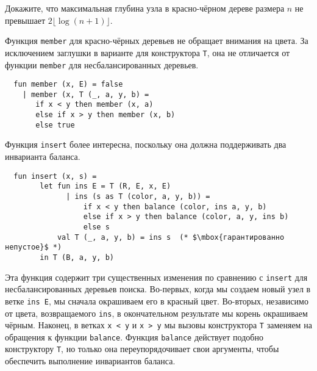 \begin{exercise}\label{ex:3.8}
  Докажите, что максимальная глубина узла в красно-чёрном дереве
  размера $n$ не превышает $2 \lfloor \log (n+1) \rfloor$.
\end{exercise}

Функция \lstinline!member! для красно-чёрных деревьев не обращает
внимания на цвета. За исключением заглушки в варианте для конструктора
\lstinline!T!, она не отличается от функции \lstinline!member! для
несбалансированных деревьев.
\begin{lstlisting}
  fun member (x, E) = false
    | member (x, T (_, a, y, b) =
       if x < y then member (x, a)
       else if x > y then member (x, b)
       else true
\end{lstlisting}
Функция \lstinline!insert! более интересна, поскольку она должна
поддерживать два инварианта баланса.
\begin{lstlisting}
  fun insert (x, s) =
        let fun ins E = T (R, E, x, E)
              | ins (s as T (color, a, y, b)) =
                  if x < y then balance (color, ins a, y, b)
                  else if x > y then balance (color, a, y, ins b)
                  else s
            val T (_, a, y, b) = ins s  (* $\mbox{гарантированно непустое}$ *)
        in T (B, a, y, b)
\end{lstlisting}
Эта функция содержит три существенных изменения по сравнению с \lstinline!insert! для
несбалансированных деревьев поиска. Во-первых, когда мы создаем новый
узел в ветке \lstinline!ins E!, мы сначала окрашиваем его в красный
цвет. Во-вторых, независимо от цвета, возвращаемого \lstinline!ins!,
в окончательном результате мы корень окрашиваем чёрным. Наконец, в
ветках \lstinline!x < y! и \lstinline!x > y! мы вызовы конструктора
\lstinline!T! заменяем на обращения к функции
\lstinline!balance!. Функция \lstinline!balance! действует подобно
конструктору \lstinline!T!, но только она переупорядочивает свои
аргументы, чтобы обеспечить выполнение инвариантов баланса.

